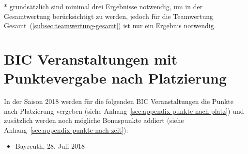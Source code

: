 * grundsätzlich sind minimal drei Ergebnisse notwendig, um in der Gesamtwertung berücksichtigt zu werden, jedoch für die Teamwertung Gesamt~(\ref{subsec:teamwertung-gesamt}) ist nur ein Ergebnis notwendig.

\section{BIC Veranstaltungen mit Punktevergabe nach Platzierung}
\label{sec:appendix-veranstaltungen-nach-platzierung}
In der Saison 2018 werden für die folgenden BIC Veranstaltungen die Punkte nach Platzierung vergeben (siehe Anhang~\ref{sec:appendix-punkte-nach-platz}) und zusätzlich werden noch mögliche Bonuspunkte addiert (siehe Anhang~\ref{sec:appendix-punkte-nach-zeit}):

\begin{itemize}
	\item Bayreuth, 28. Juli 2018
\end{itemize}